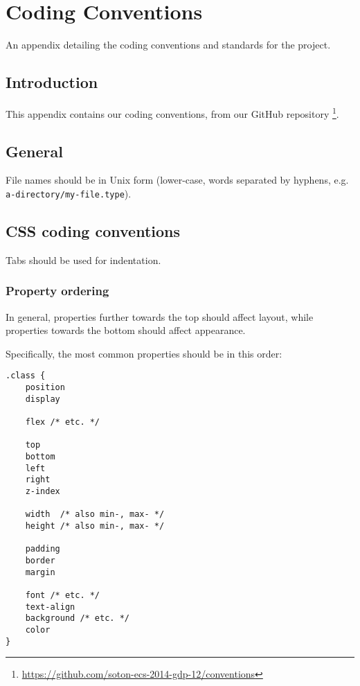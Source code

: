 \chapter{Coding Conventions} \label{Chapter:Coding Conventions}

\begin{preamble}
	An appendix detailing the coding conventions and standards for the project.
\end{preamble}

\section{Introduction}

This appendix contains our coding conventions, from our GitHub repository
\footnote{\url{https://github.com/soton-ecs-2014-gdp-12/conventions}}.

\section{General}

File names should be in Unix form (lower-case, words separated by
hyphens, e.g. \texttt{a-directory/my-file.type}).

\section{CSS coding conventions}

Tabs should be used for indentation.

\subsection{Property ordering}

In general, properties further towards the top should affect layout,
while properties towards the bottom should affect appearance.

Specifically, the most common properties should be in this order:

\begin{lstlisting}
.class {
	position
	display

	flex /* etc. */

	top
	bottom
	left
	right
	z-index

	width  /* also min-, max- */
	height /* also min-, max- */

	padding
	border
	margin

	font /* etc. */
	text-align
	background /* etc. */
	color
}
\end{lstlisting}

